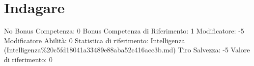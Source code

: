 \section{Indagare}\label{indagare}

\begin{description}
\tightlist
\item[Tags: ABI]
No Bonus Competenza: 0 Bonus Competenza di Riferimento: 1 Modificatore:
-5 Modificatore Abilità: 0 Statistica di riferimento: Intelligenza
(Intelligenza\%20c5fd18041a33489e88aba52c416acc3b.md) Tiro Salvezza: -5
Valore di riferimento: 0
\end{description}
